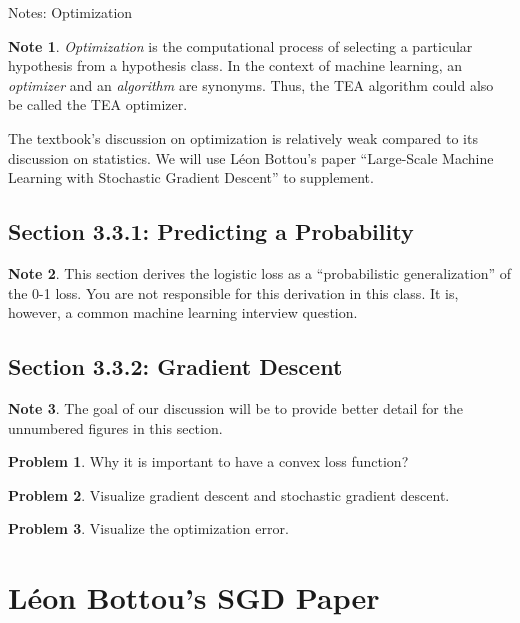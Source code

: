 \documentclass[10pt]{exam}
\theoremstyle{definition}
\newtheorem{problem}{Problem}
\newtheorem{note}{Note}
\begin{document}
\begin{center}
{
\Huge
Notes: Optimization
}
\end{center}

\begin{note}
\emph{Optimization} is the computational process of selecting a particular hypothesis from a hypothesis class.
In the context of machine learning, an \emph{optimizer} and an \emph{algorithm} are synonyms.
Thus, the TEA algorithm could also be called the TEA optimizer.

The textbook's discussion on optimization is relatively weak compared to its discussion on statistics.
We will use L\'eon Bottou's paper ``Large-Scale Machine Learning with Stochastic Gradient Descent'' to supplement.
\end{note}

\subsection*{Section 3.3.1: Predicting a Probability}

\begin{note}
    This section derives the logistic loss as a ``probabilistic generalization'' of the 0-1 loss.
    You are not responsible for this derivation in this class.
    It is, however, a common machine learning interview question.
\end{note}

\newpage
\subsection*{Section 3.3.2: Gradient Descent}

\begin{note}
The goal of our discussion will be to provide better detail for the unnumbered figures in this section.
\end{note}

\begin{problem}
Why it is important to have a convex loss function?
\end{problem}
\newpage
\begin{problem}
Visualize gradient descent and stochastic gradient descent.
\end{problem}
\newpage
\begin{problem}
Visualize the optimization error.
\end{problem}

\newpage
\section*{L\'eon Bottou's SGD Paper}
\end{document}
